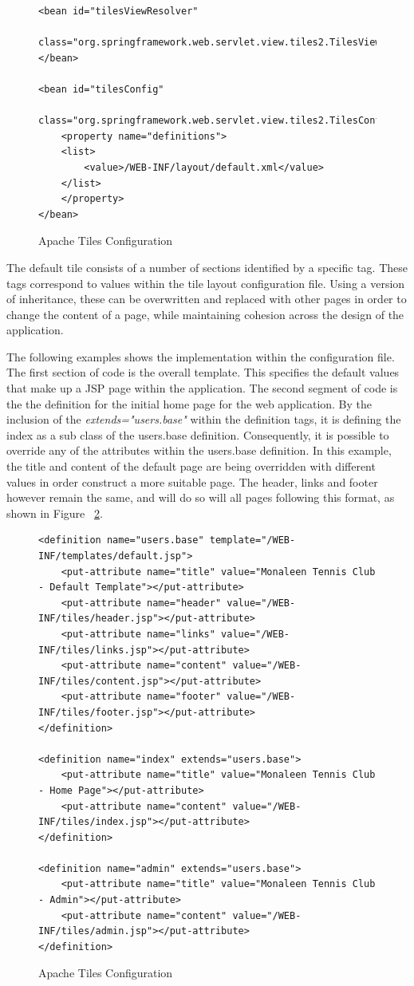 \begin{figure}[H]
\begin{lstlisting}
<bean id="tilesViewResolver"
	class="org.springframework.web.servlet.view.tiles2.TilesViewResolver">
</bean>

<bean id="tilesConfig"
	class="org.springframework.web.servlet.view.tiles2.TilesConfigurer">
	<property name="definitions">
	<list>
		<value>/WEB-INF/layout/default.xml</value>
	</list>
	</property>
</bean>
\end{lstlisting}
\caption{Apache Tiles Configuration}
\label{fig:tilesXML}
\end{figure}

The default tile consists of a number of sections identified by a specific tag. These tags correspond to values within the tile layout configuration file. Using a version of inheritance, these can be overwritten and replaced with other pages in order to change the content of a page, while maintaining cohesion across the design of the application. 

The following examples shows the implementation within the configuration file. The first section of code is the overall template. This specifies the default values that make up a JSP page within the application. The second segment of code is the the definition for the initial home page for the web application. By the inclusion of the \textit{extends="users.base"} within the definition tags, it is defining the index as a sub class of the users.base definition. Consequently, it is possible to override any of the attributes within the users.base definition. In this example, the title and content of the default page are being overridden with different values in order construct a more suitable page. The header, links and footer however remain the same, and will do so will all pages following this format, as shown in Figure ~\ref{fig:tilesConfig}.

\begin{figure}[H]
\begin{lstlisting}
<definition name="users.base" template="/WEB-INF/templates/default.jsp">
	<put-attribute name="title" value="Monaleen Tennis Club - Default Template"></put-attribute>
	<put-attribute name="header" value="/WEB-INF/tiles/header.jsp"></put-attribute>
	<put-attribute name="links" value="/WEB-INF/tiles/links.jsp"></put-attribute>
	<put-attribute name="content" value="/WEB-INF/tiles/content.jsp"></put-attribute>
	<put-attribute name="footer" value="/WEB-INF/tiles/footer.jsp"></put-attribute>
</definition>

<definition name="index" extends="users.base">
	<put-attribute name="title" value="Monaleen Tennis Club - Home Page"></put-attribute>
	<put-attribute name="content" value="/WEB-INF/tiles/index.jsp"></put-attribute>
</definition>

<definition name="admin" extends="users.base">
	<put-attribute name="title" value="Monaleen Tennis Club - Admin"></put-attribute>
	<put-attribute name="content" value="/WEB-INF/tiles/admin.jsp"></put-attribute>
</definition>
\end{lstlisting}
\caption{Apache Tiles Configuration}
\label{fig:tilesConfig}
\end{figure}

